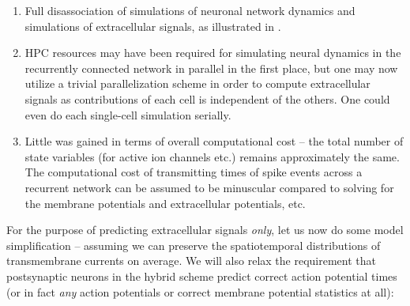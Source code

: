 \begin{enumerate}
\item Full disassociation of simulations of neuronal network dynamics and simulations of extracellular signals,
as illustrated in .
\item HPC resources may have been required for simulating neural dynamics in the recurrently connected network in parallel in the first place,
but one may now utilize a trivial parallelization scheme in order to compute extracellular signals as contributions of each cell is independent of the others.
One could even do each single-cell simulation serially.
\item Little was gained in terms of overall computational cost -- the total number of state variables (for active ion channels etc.) remains approximately the same.
The computational cost of transmitting times of spike events across a recurrent network can be assumed to be minuscular compared to solving for the membrane potentials and extracellular potentials, etc.
\end{enumerate}

For the purpose of predicting extracellular signals \emph{only}, let us now do some model simplification -- assuming we can preserve the spatiotemporal distributions of transmembrane currents on average. We will also relax the requirement  that postsynaptic neurons in the hybrid scheme predict correct action potential times (or in fact \emph{any} action potentials or correct membrane potential statistics at all): 

